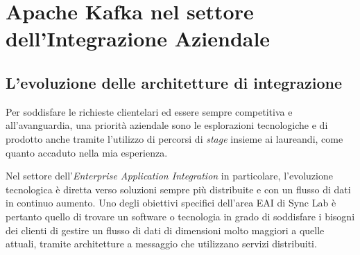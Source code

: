 \chapter{Apache Kafka nel settore dell’Integrazione Aziendale}

\section{L'evoluzione delle architetture di integrazione}
Per soddisfare le richieste clientelari ed essere sempre competitiva e all'avanguardia, una priorità aziendale sono le esplorazioni tecnologiche e di prodotto anche tramite l'utilizzo di percorsi di \textit{stage} insieme ai laureandi, come quanto accaduto nella mia esperienza.

Nel settore dell'\textit{Enterprise Application Integration} in particolare, l'evoluzione tecnologica è diretta verso soluzioni sempre più distribuite e con un flusso di dati in continuo aumento.
Uno degli obiettivi specifici dell'area EAI di Sync Lab è pertanto quello di trovare un software o tecnologia in grado di soddisfare i bisogni dei clienti di gestire un flusso di dati di dimensioni molto maggiori a quelle attuali, tramite architetture a messaggio che utilizzano servizi distribuiti.

